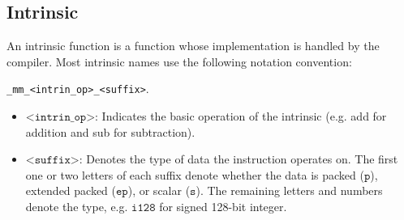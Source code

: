 \subsection{Intrinsic}
An intrinsic function is a function whose implementation is handled by the compiler. Most intrinsic names use the following notation convention: 

\texttt{\_mm\_<intrin\_op>\_<suffix>}.
\begin{itemize}
    \item $\texttt{<intrin\_op>}$: Indicates the basic operation of the intrinsic (e.g. add for addition and sub for subtraction).
    \item $\texttt{<suffix>}$: Denotes the type of data the instruction operates on. The first one or two letters of each suffix denote whether the data is packed ($\texttt{p}$), extended packed ($\texttt{ep}$), or scalar ($\texttt{s}$). The remaining letters and numbers denote the type, e.g. $\texttt{i128}$ for signed 128-bit integer.
\end{itemize}